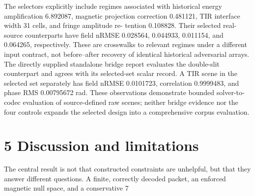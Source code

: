 \documentclass[11pt]{article}
\begin{document}
The selectors explicitly include regimes associated with historical energy amplification 6.892087,
magnetic projection correction 0.481121, TIR interface width 31 cells, and fringe amplitude re-
tention 0.108828. Their selected real-source counterparts have field nRMSE 0.028564, 0.044933,
0.011154, and 0.064265, respectively. These are crosswalks to relevant regimes under a different
input contract, not before–after recovery of identical historical adversarial arrays.
The directly supplied standalone bridge report evaluates the double-slit counterpart and agrees
with its selected-set scalar record. A TIR scene in the selected set separately has field nRMSE
0.0101723, correlation 0.9999483, and phase RMS 0.00795672 rad. These observations demonstrate
bounded solver-to-codec evaluation of source-defined raw scenes; neither bridge evidence nor the
four controls expands the selected design into a comprehensive corpus evaluation.

\section*{5 Discussion and limitations}

The central result is not that constructed constraints are unhelpful, but that they answer different
questions. A finite, correctly decoded packet, an enforced magnetic null space, and a conservative
7
\end{document}
